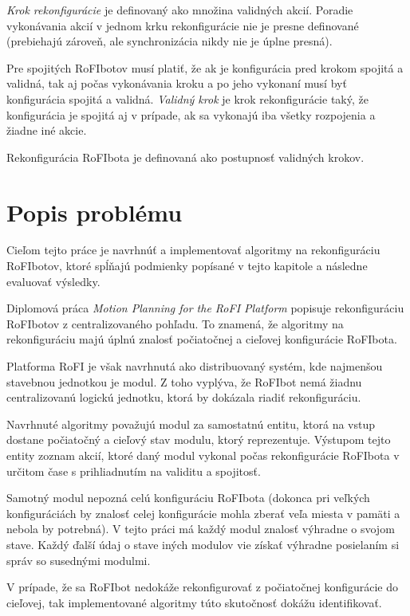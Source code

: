 \documentclass[
  digital, %
  oneside, %
  table,   %
  lof,     %
  nolot,     %
]{fithesis3}
\begin{document}

\textit{Krok rekonfigurácie} je definovaný ako množina validných akcií. Poradie vykonávania akcií v jednom krku rekonfigurácie nie je presne definované (prebiehajú zároveň, ale synchronizácia nikdy nie je úplne presná). 

Pre spojitých RoFIbotov musí platiť, že ak je konfigurácia pred krokom spojitá a validná, tak aj počas vykonávania kroku a po jeho vykonaní musí byť konfigurácia spojitá a validná. \textit{Validný krok} je krok rekonfigurácie taký, že konfigurácia je spojitá aj v prípade, ak sa vykonajú iba všetky rozpojenia a žiadne iné akcie. 

Rekonfigurácia RoFIbota je definovaná ako postupnosť validných krokov. 

\section{Popis problému}
\label{sec:problemDesc}
Cieľom tejto práce je navrhnúť a implementovať algoritmy na rekonfiguráciu RoFIbotov, ktoré spĺňajú podmienky popísané v tejto kapitole a následne evaluovať výsledky. 

Diplomová práca \textit{Motion Planning for the RoFI Platform} \cite{vozarovaMasterThesis} popisuje rekonfiguráciu RoFIbotov z centralizovaného pohľadu. To znamená, že algoritmy na rekonfiguráciu majú úplnú znalosť počiatočnej a cieľovej konfigurácie RoFIbota. 

Platforma RoFI je však navrhnutá ako distribuovaný systém, kde najmenšou stavebnou jednotkou je modul. Z toho vyplýva, že RoFIbot nemá žiadnu centralizovanú logickú jednotku, ktorá by dokázala riadiť rekonfiguráciu. 

Navrhnuté algoritmy považujú modul za samostatnú entitu, ktorá na vstup dostane počiatočný a cieľový stav modulu, ktorý reprezentuje. Výstupom tejto entity zoznam akcií, ktoré daný modul vykonal počas rekonfigurácie RoFIbota v určitom čase s prihliadnutím na validitu a spojitosť.  

Samotný modul nepozná celú konfiguráciu RoFIbota (dokonca pri veľkých konfiguráciách by znalosť celej konfigurácie mohla zberať veľa miesta v pamäti a nebola by potrebná). V tejto práci má každý modul znalosť výhradne o svojom stave. Každý ďalší údaj o stave iných modulov vie získať výhradne posielaním si správ so susednými modulmi. 

V prípade, že sa RoFIbot nedokáže rekonfigurovať z počiatočnej konfigurácie do cieľovej, tak implementované algoritmy túto skutočnosť dokážu identifikovať. 
\end{document}
